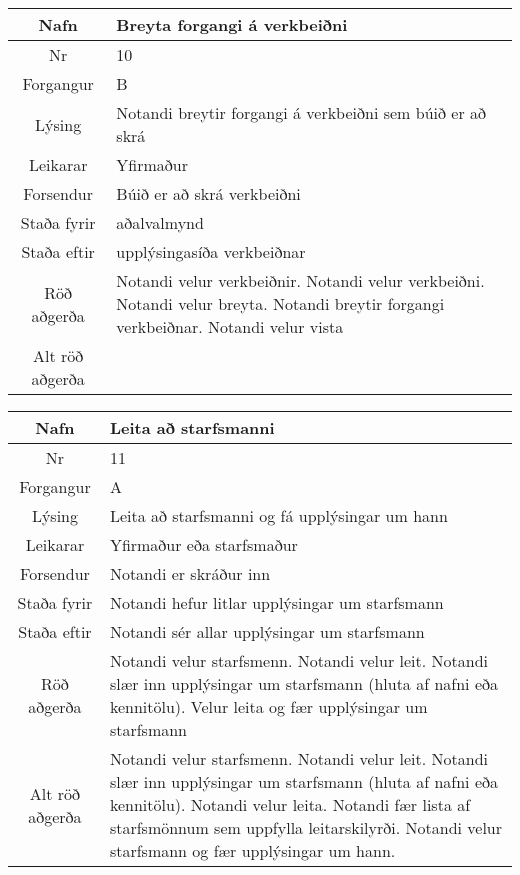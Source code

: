 \begin{table}[h!]\centering
\begin{tabular}{|c|p{10cm}|}
\hline
Nafn&Breyta forgangi á verkbeiðni\\
\hline
Nr&10\\
\hline
Forgangur&B\\
\hline
Lýsing&Notandi breytir forgangi á verkbeiðni sem búið er að skrá\\
\hline
Leikarar&Yfirmaður\\
\hline
Forsendur&Búið er að skrá verkbeiðni\\
\hline
Staða fyrir&aðalvalmynd\\
\hline
Staða eftir&upplýsingasíða verkbeiðnar\\
\hline
Röð aðgerða&Notandi velur verkbeiðnir. Notandi velur verkbeiðni. Notandi velur breyta. Notandi breytir forgangi verkbeiðnar. Notandi velur vista\\
\hline
Alt röð aðgerða&\\
\hline
\end{tabular}
\end{table}
\caption{Use case 10}\label{tab:use_case_10}
\begin{table}[h!]\centering
\begin{tabular}{|c|p{10cm}|}
\hline
Nafn&Leita að starfsmanni \\
\hline
Nr&11\\
\hline
Forgangur&A\\
\hline
Lýsing&Leita að starfsmanni og fá upplýsingar um hann\\
\hline
Leikarar&Yfirmaður eða starfsmaður\\
\hline
Forsendur&Notandi er skráður inn\\
\hline
Staða fyrir&Notandi hefur litlar upplýsingar um starfsmann\\
\hline
Staða eftir&Notandi sér allar upplýsingar um starfsmann\\
\hline
Röð aðgerða&Notandi velur starfsmenn. Notandi velur leit. Notandi slær inn upplýsingar um starfsmann (hluta af nafni eða kennitölu). Velur leita og fær upplýsingar um starfsmann\\
\hline
Alt röð aðgerða&Notandi velur starfsmenn. Notandi velur leit. Notandi slær inn upplýsingar um starfsmann (hluta af nafni eða kennitölu). Notandi velur leita. Notandi fær lista af starfsmönnum sem uppfylla leitarskilyrði. Notandi velur starfsmann og fær upplýsingar um hann.\\
\hline
\end{tabular}
\end{table}
